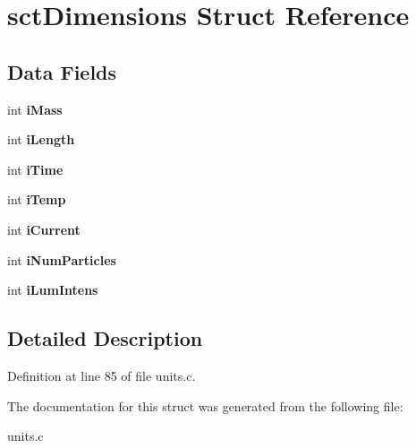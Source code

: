 \hypertarget{structsctDimensions}{\section{sct\-Dimensions Struct Reference}
\label{structsctDimensions}
}
\subsection*{Data Fields}
\begin{DoxyCompactItemize}
\item 
\hypertarget{structsctDimensions_a71f153c4fce505086291dbf260d97727}{int {\bfseries i\-Mass}}\label{structsctDimensions_a71f153c4fce505086291dbf260d97727}

\item 
\hypertarget{structsctDimensions_a4719d90868cf9e6a254eeecc2bcc654a}{int {\bfseries i\-Length}}\label{structsctDimensions_a4719d90868cf9e6a254eeecc2bcc654a}

\item 
\hypertarget{structsctDimensions_a040c5fff87d88298509539b38633787d}{int {\bfseries i\-Time}}\label{structsctDimensions_a040c5fff87d88298509539b38633787d}

\item 
\hypertarget{structsctDimensions_a1a81293d6a0e4bc69a53ddddc01d9eab}{int {\bfseries i\-Temp}}\label{structsctDimensions_a1a81293d6a0e4bc69a53ddddc01d9eab}

\item 
\hypertarget{structsctDimensions_a98ed965f8d0625a2cc5ba9ee0bac7f8d}{int {\bfseries i\-Current}}\label{structsctDimensions_a98ed965f8d0625a2cc5ba9ee0bac7f8d}

\item 
\hypertarget{structsctDimensions_a97f69178bd92ccad7f3e28cdad9d6c14}{int {\bfseries i\-Num\-Particles}}\label{structsctDimensions_a97f69178bd92ccad7f3e28cdad9d6c14}

\item 
\hypertarget{structsctDimensions_af7f26b5ab8e64272f295d259c3875ca9}{int {\bfseries i\-Lum\-Intens}}\label{structsctDimensions_af7f26b5ab8e64272f295d259c3875ca9}

\end{DoxyCompactItemize}


\subsection{Detailed Description}


Definition at line 85 of file units.\-c.



The documentation for this struct was generated from the following file\-:\begin{DoxyCompactItemize}
\item 
units.\-c\end{DoxyCompactItemize}
